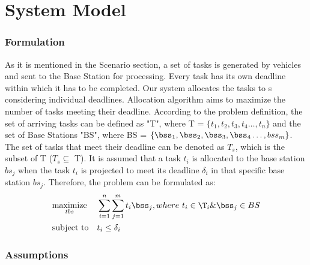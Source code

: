 
\section{System Model}
\subsubsection{Formulation}
As it is mentioned in the Scenario section, a set of tasks is generated by vehicles and sent to the Base Station for processing. Every task has its own deadline within which it has to be completed. Our system allocates the tasks to \bs s considering individual deadlines. Allocation algorithm aims to maximize the number of tasks meeting their deadline. According to the problem definition, the set of arriving tasks can be defined as "T", where  T = $\{t_1, t_2, t_3, t_4\dots,t_n\}$ and the set of Base Stations "BS", where BS = $\{\bss_1, \bss_2, \bss_3, \bss_4\dots,bss_m\}$. The set of tasks that meet their deadline can be denoted as $T_s$, which is the subset of T ($T_s \subseteq$ T). It is assumed that a task $t_i$ is allocated to the base station $bs_j$ when the task $t_i$ is projected to meet its deadline $\delta_i$ in that specific base station $bs_j$. Therefore, the problem can be formulated as:
\begin{equation*}
\begin{aligned}
&  \underset{tbs}{\text{maximize}}
& & \sum_{i=1}^{n} \sum_{j=1}^{m} t_i \bss_j , where~t_i \in \T_i \& \bss_j \in BS\\
& \text{subject to}
& &  t_i \leq \delta_i\;
\end{aligned}
\end{equation*}

\subsubsection{Assumptions}

